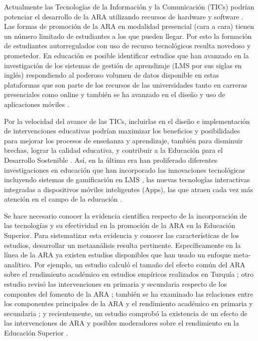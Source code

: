 \documentclass[spanish]{textolivre}
\begin{document}
Actualmente las Tecnologías de la Información y la Comunicación (TICs) podrían potenciar el desarrollo de la ARA utilizando recursos de hardware y software \cite{dignath2015fostering, wong2019supporting}. Las formas de promoción de la ARA en modalidad presencial (cara a cara) tienen un número limitado de estudiantes a los que pueden llegar. Por esto la formación de estudiantes autorregulados con uso de recurso tecnológicos resulta novedoso y prometedor. En educación es posible identificar estudios que han avanzado en la investigación de los sistemas de gestión de aprendizaje (LMS por sus siglas en inglés) respondiendo al poderoso volumen de datos disponible en estas plataformas que son parte de los recursos de las universidades tanto en carreras presenciales como online \cite{matcha2020systematic, viberg2018current} y también se ha avanzado en el diseño y uso de aplicaciones móviles \cite{viberg2020mobile}. 

Por la velocidad del avance de las TICs, incluirlas en el diseño e implementación de intervenciones educativas podrían maximizar los beneficios y posibilidades para mejorar los procesos de enseñanza y aprendizaje, también para disminuir brechas, lograr la calidad educativa, y contribuir a la Educación para el Desarrollo Sostenible \cite{carrion2022effects}. Así, en la última era han proliferado diferentes investigaciones en educación que han incorporado las innovaciones tecnológicas incluyendo sistemas de gamificación en LMS \cite{alhalafawy2022has}, las nuevas tecnologías interactivas integradas a dispositivos móviles inteligentes (Apps), las que atraen cada vez más atención en el campo de la educación \cite{dorouka2020tablets}. 

Se hace necesario conocer la evidencia científica respecto de la incorporación de las tecnologías y su efectividad en la promoción de la ARA en la Educación Superior. Para sistematizar esta evidencia y conocer las características de los estudios, desarrollar un metaanálisis resulta pertinente. Específicamente en la línea de la ARA ya existen estudios disponibles que han usado un enfoque meta-analítico. Por ejemplo, un estudio calculó el tamaño del efecto común del ARA sobre el rendimiento académico en estudios empíricos realizados en Turquía \cite{ergen2017effect}; otro estudio revisó las intervenciones en primaria y secundaria respecto de los compontes del fomento de la ARA \cite{dignath2008components}; también se ha examinado las relaciones entre los componentes principales de la ARA y el rendimiento académico en primaria y secundaria \cite{dent2016relation}; y recientemente, un estudio comprobó la existencia de un efecto de las intervenciones de ARA y posibles moderadores sobre el rendimiento en la Educación Superior \cite{jansen2016fostering}. 
\end{document}
